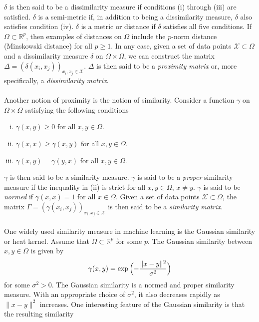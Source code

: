 $\delta$ is then said to be a dissimilarity measure if conditions (i)
through (iii) are satisfied. $\delta$ is a semi-metric if, in addition
to being a dissimilarity measure, $\delta$ also satisfies condition
(iv). $\delta$ is a metric or distance if $\delta$ satisfies all five
conditions. If $\Omega \subset \mathbb{R}^{p}$, then examples of
distances on $\Omega$ include the $p$-norm distance (Minskowski
distance) for all $p \geq 1$. In any case, given a set of data points
$\mathcal{X} \subset \Omega$ and a dissimilarity measure $\delta$ on
$\Omega \times \Omega$, we can construct the matrix $\Delta =
(\delta(x_i,x_j))_{x_i,x_j \in \mathcal{X}}$. $\Delta$ is then said to
be a \emph{proximity matrix} or, more specifically, a \emph{dissimilarity
  matrix}. \\ \\
%
%
\noindent
Another notion of proximity is the notion of similarity. Consider a
function $\gamma$ on $\Omega \times \Omega$ satisfying the
following conditions
\begin{enumerate}[(i)]
\item $\gamma(x,y) \geq 0$ for all $x,y \in \Omega$.
\item $\gamma(x,x) \geq \gamma(x,y)$ for all $x,y \in \Omega$.
\item $\gamma(x,y) = \gamma(y,x)$ for all $x,y \in \Omega$.
\end{enumerate}
$\gamma$ is then said to be a similarity measure. $\gamma$ is said to
be a \emph{proper} similarity measure if the inequality in (ii) is strict for
all $x,y \in \Omega$, $x \not = y$. $\gamma$ is said to be
\emph{normed} if $\gamma(x,x) = 1$ for all $x \in \Omega$. Given a set
of data points $\mathcal{X} \subset \Omega$, the matrix $\Gamma =
(\gamma(x_i,x_j))_{x_i,x_j \in \mathcal{X}}$ is then said to be a
\emph{similarity matrix}. \\ \\
%
%
\noindent One widely used similarity measure in machine learning is the Gaussian
similarity or heat kernel. Assume that $\Omega \subset \mathbb{R}^{p}$
for some $p$. The Gaussian similarity between $x,y \in \Omega$ is
given by
\begin{equation}
  \label{eq:100}
  \gamma(x,y) = \exp{\Bigl(-\frac{\|x - y\|^{2}}{\sigma^2}\Bigr)}
\end{equation}
for some $\sigma^2 > 0$. The Gaussian similarity is a normed and
proper similarity measure. With an appropriate choice of $\sigma^2$,
it also decreases rapidly as $\|x - y\|^2$ increases. One interesting
feature of the Gaussian similarity is that the resulting similarity
